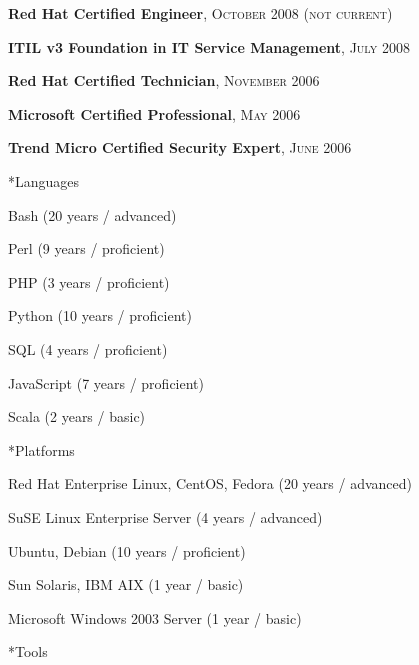 \documentclass[10pt, a4paper, final]{article}
\begin{document}
\begin{section}
\begin{subsection}
\begin{compactitem}
      \item \textbf{Red Hat Certified Engineer}, \textsc{October 2008 (not current)}
      \item \textbf{ITIL v3 Foundation in IT Service Management}, \textsc{July 2008}
      \item \textbf{Red Hat Certified Technician}, \textsc{November 2006}
      \item \textbf{Microsoft Certified Professional}, \textsc{May 2006}
      \item \textbf{Trend Micro Certified Security Expert}, \textsc{June 2006}
    \end{compactitem}
  \end{subsection}
  \vspace{1em}
  \begin{subsection}*{Languages}
    \begin{compactitem}
      \item Bash (20 years / advanced) 
      \item Perl (9 years / proficient) 
      \item PHP (3 years / proficient) 
      \item Python (10 years / proficient) 
      \item SQL (4 years / proficient) 
      \item JavaScript (7 years / proficient) 
      \item Scala (2 years / basic) 
    \end{compactitem}
  \end{subsection}
  \vspace{1em}
  \begin{subsection}*{Platforms}
    \begin{compactitem}
      \item Red Hat Enterprise Linux, CentOS, Fedora (20 years / advanced) 
      \item SuSE Linux Enterprise Server (4 years / advanced) 
      \item Ubuntu, Debian (10 years / proficient) 
      \item Sun Solaris, IBM AIX (1 year / basic) 
      \item Microsoft Windows 2003 Server (1 year / basic) 
    \end{compactitem}
  \end{subsection}
  \vspace{1em}
  \begin{subsection}*{Tools}
    \begin{compactitem}

\end{compactitem}
\end{subsection}
\end{section}
\end{document}
